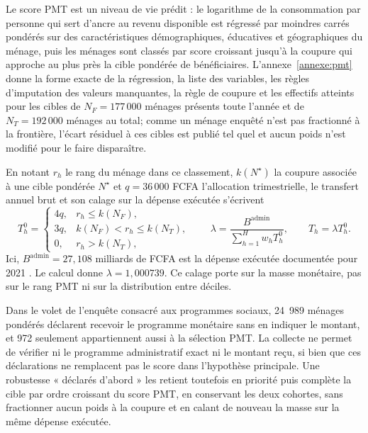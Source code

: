 \documentclass[11pt,a4paper]{article}
\begin{document}
Le score PMT est un niveau de vie prédit : le logarithme de la consommation par
personne qui sert d'ancre au revenu disponible est régressé par moindres carrés
pondérés sur des caractéristiques démographiques, éducatives et géographiques du
ménage, puis les ménages sont classés par score croissant jusqu'à la coupure qui
approche au plus près la cible pondérée de bénéficiaires. L'annexe~\ref{annexe:pmt}
donne la forme exacte de la régression, la liste des variables, les règles
d'imputation des valeurs manquantes, la règle de coupure et les effectifs
atteints pour les cibles de $N_F=177\,000$ ménages présents toute l'année et de
$N_T=192\,000$ ménages au total; comme un ménage enquêté n'est pas fractionné à
la frontière, l'écart résiduel à ces cibles est publié tel quel et aucun poids
n'est modifié pour le faire disparaître.

En notant $r_h$ le rang du ménage dans ce classement, $k(N^\star)$ la coupure
associée à une cible pondérée $N^\star$ et $q=36\,000$ FCFA l'allocation
trimestrielle, le transfert annuel brut et son calage sur la dépense exécutée
s'écrivent
\begin{equation}
T_h^{0}=\begin{cases}
4q,& r_h\leq k(N_F),\\
3q,& k(N_F)<r_h\leq k(N_T),\\
0,& r_h>k(N_T),
\end{cases}
\qquad
\lambda=\frac{B^{\mathrm{admin}}}{\sum_{h=1}^{H}w_hT_h^{0}},
\qquad T_h=\lambda T_h^{0}.
\label{eq:pmt-transfer}
\end{equation}
Ici, $B^{\mathrm{admin}}=27{,}108$ milliards de FCFA est la dépense exécutée
documentée pour 2021 \citep{civperformance2021}. Le calcul donne
$\lambda=1{,}000739$. Ce calage porte sur la masse monétaire, pas sur le rang PMT
ni sur la distribution entre déciles.

Dans le volet de l'enquête consacré aux programmes sociaux, 24~989 ménages
pondérés déclarent recevoir le programme monétaire sans en indiquer le montant,
et 972 seulement appartiennent aussi à la sélection PMT. La collecte ne permet
de vérifier ni le programme administratif exact ni le montant reçu, si bien que
ces déclarations ne remplacent pas le score dans l'hypothèse principale. Une
robustesse « déclarés d'abord » les retient toutefois en priorité puis complète
la cible par ordre croissant du score PMT, en conservant les deux cohortes, sans
fractionner aucun poids à la coupure et en calant de nouveau la masse sur la
même dépense exécutée.
\end{document}
